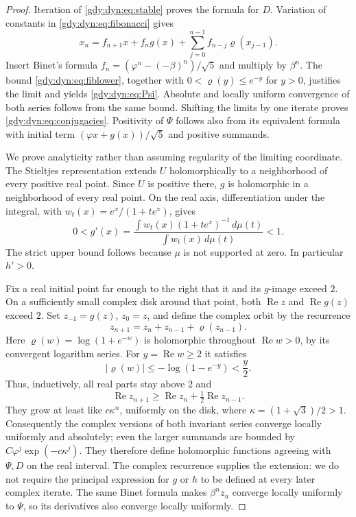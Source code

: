 \documentclass[11pt]{article}
\numberwithin{equation}{section}
\theoremstyle{definition}
\theoremstyle{remark}
\DeclareMathOperator{\Rea}{Re}
\begin{document}
\begin{proof}
Iteration of \eqref{gdy:dyn:eq:stable} proves the formula for $D$.
Variation of constants in \eqref{gdy:dyn:eq:fibonacci} gives
\[
 x_n=f_{n+1}x+f_ng(x)
       +\sum_{j=0}^{n-1}f_{n-j}\varrho(x_{j-1}).
\]
Insert Binet's formula
$f_n=(\varphi^n-(-\beta)^n)/\sqrt5$ and multiply by $\beta^n$.
The bound \eqref{gdy:dyn:eq:fiblower}, together with $0<\varrho(y)\le e^{-y}$ for
$y>0$, justifies the limit and yields \eqref{gdy:dyn:eq:Psi}. Absolute and
locally uniform convergence of both series follows from the same bound.
Shifting the limits by one iterate proves
\eqref{gdy:dyn:eq:conjugacies}. Positivity of $\Psi$ follows also from its
equivalent formula with initial term
$(\varphi x+g(x))/\sqrt5$ and positive summands.

We prove analyticity rather than assuming regularity of the limiting
coordinate. The Stieltjes representation extends $U$ holomorphically
to a neighborhood of every positive real point. Since $U$ is positive
there, $g$ is holomorphic in a neighborhood of every real point. On the
real axis, differentiation under the integral, with
$w_t(x)=e^x/(1+te^x)$, gives
\begin{equation}\label{gdy:dyn:eq:gprime}
 0<g'(x)=
 \frac{\int w_t(x)(1+te^x)^{-1}\,d\mu(t)}
      {\int w_t(x)\,d\mu(t)}<1.
\end{equation}
The strict upper bound follows because $\mu$ is not supported at zero.
In particular $h'>0$.

Fix a real initial point far enough to the right that it and its
$g$-image exceed $2$. On a sufficiently small complex disk around that
point, both $\Rea z$ and $\Rea g(z)$ exceed $2$.
Set $z_{-1}=g(z)$, $z_0=z$, and define the complex orbit by the recurrence
\[
 z_{n+1}=z_n+z_{n-1}+\varrho(z_{n-1}).
\]
Here $\varrho(w)=\log(1+e^{-w})$ is holomorphic throughout
$\Rea w>0$, by its convergent logarithm series. For
$y=\Rea w\ge2$ it satisfies
\[
 |\varrho(w)|\le-\log(1-e^{-y})<\frac y2.
\]
Thus, inductively, all real parts stay above $2$ and
\[
 \Rea z_{n+1}\ge
 \Rea z_n+\tfrac12\Rea z_{n-1}.
\]
They grow at least like $c\kappa^n$, uniformly on the disk, where
$\kappa=(1+\sqrt3)/2>1$. Consequently the complex versions of both
invariant series converge locally uniformly and absolutely; even the
larger summands are bounded by $C\varphi^j\exp(-c\kappa^j)$.
They therefore define holomorphic functions agreeing with $\Psi,D$
on the real interval. The complex recurrence supplies the extension:
we do not require the principal expression for $g$ or $h$ to be defined
at every later complex iterate. The same Binet formula makes
$\beta^nz_n$ converge locally uniformly to $\Psi$, so its derivatives
also converge locally uniformly.


\end{proof}
\end{document}
